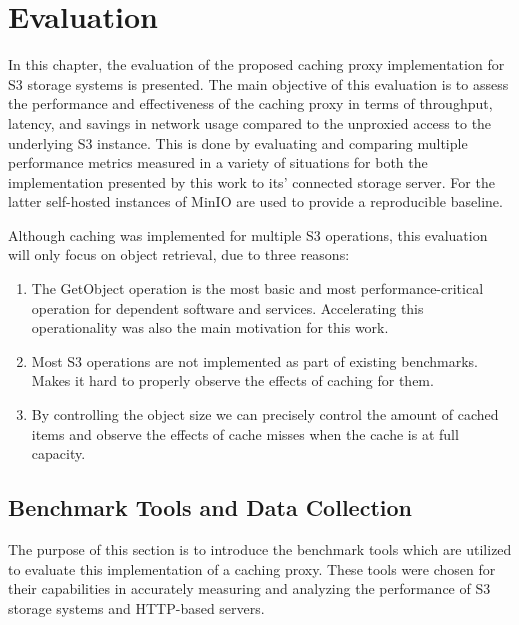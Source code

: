 \chapter{Evaluation}

In this chapter, the evaluation of the proposed caching proxy implementation for S3 storage systems is presented. The main objective of this evaluation is to assess the performance and effectiveness of the caching proxy in terms of throughput, latency, and savings in network usage compared to the unproxied access to the underlying S3 instance.
This is done by evaluating and comparing multiple performance metrics measured in a variety of situations for both the implementation presented by this work to its' connected storage server. For the latter self-hosted instances of MinIO are used to provide a reproducible baseline.

Although caching was implemented for multiple S3 operations, this evaluation will only focus on object retrieval, due to three reasons:
\begin{enumerate}
	\item The GetObject operation is the most basic and most performance-critical operation for dependent software and services. Accelerating this operationality was also the main motivation for this work.
	\item Most S3 operations are not implemented as part of existing benchmarks. Makes it hard to properly observe the effects of caching for them.
	\item By controlling the object size we can precisely control the amount of cached items and observe the effects of cache misses when the cache is at full capacity.
\end{enumerate}

\section{Benchmark Tools and Data Collection}

The purpose of this section is to introduce the benchmark tools which are utilized to evaluate this implementation of a caching proxy. These tools were chosen for their capabilities in accurately measuring and analyzing the performance of S3 storage systems and HTTP-based servers.

